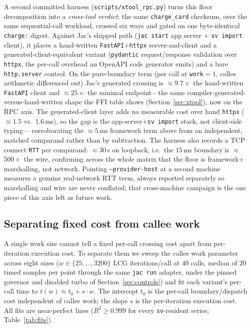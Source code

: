 \documentclass[conference]{IEEEtran}
\newcommand{\code}[1]{\texttt{#1}}
\begin{document}
A second committed harness (\code{scripts/xtool\_rpc.py}) turns this floor
decomposition into a \emph{cross-tool verdict}: the same \code{charge\_card}
checksum, over the same sequential-call workload, crossed six ways and gated on
one byte-identical \code{charge:} digest. Against Jac's shipped path
(\code{jac start} app server $+$ \code{sv~import} client), it places a
hand-written \code{FastAPI}$+$\code{httpx} server-and-client and a
generated-client-equivalent variant (\code{pydantic} request/response validation
over \code{httpx}, the per-call overhead an OpenAPI code generator emits) and a
bare \code{http.server} control. On the pure-boundary term (per call at
\code{work}${=}1$, callee arithmetic differenced out) Jac's generated crossing is
$\approx$$9.7\times$ the hand-written \code{FastAPI} client and
$\approx$$25\times$ the minimal endpoint---the same
compiler-generated-versus-hand-written shape the FFI table shows
(Section~\ref{sec:xtool}), now on the RPC axis. The generated-client layer adds
no measurable cost over hand \code{httpx} ($\approx$$1.5$ vs.\ $1.6$\,ms), so the
gap is the app-server$+$\code{sv~import} stack, not client-side typing---%
corroborating the $\approx$$5$\,ms framework term above from an independent,
matched comparand rather than by subtraction. The harness also records a TCP
connect \code{RTT} per comparand: $\approx$$30$\,\textmu s on loopback, i.e.\ the
$15$\,ms boundary is $\approx$$500\times$ the wire, confirming across the whole
matrix that the floor is framework$+$marshalling, not network. Pointing
\code{--provider-host} at a second machine measures a genuine real-network RTT
term, always reported separately so marshalling and wire are never conflated;
that cross-machine campaign is the one piece of this axis left as future work.

\subsection{Separating fixed cost from callee work}
\label{sec:sweep}

A single work size cannot tell a fixed per-call crossing cost apart from
per-iteration execution cost. To separate them we sweep the callee work
parameter across eight sizes ($w\in\{25,\dots,3200\}$ LCG iterations/call at
$40$ calls, median of $20$ timed samples per point through the same \code{jac run}
adapter, under the pinned governor and disabled turbo of
Section~\ref{sec:controls}) and fit each variant's per-call time to
$t(w)\approx t_0 + s\cdot w$. The intercept $t_0$ is the per-call
boundary/dispatch cost independent of callee work; the slope $s$ is the
per-iteration execution cost. All fits are near-perfect lines
($R^2\ge0.999$ for every \code{sv}-resident series; Table~\ref{tab:fits}).
\end{document}
